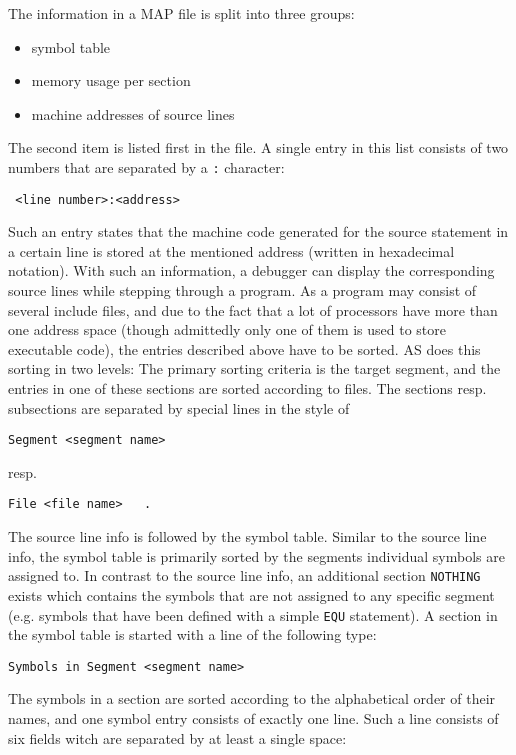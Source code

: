 \documentclass[12pt,twoside]{report}
\newcommand{\tty}[1]{{\tt #1}}
\newcommand{\asname}{{AS}}
\begin{document}
The information in a MAP file is split into three groups:
\begin{itemize}
\item{symbol table}
\item{memory usage per section}
\item{machine addresses of source lines}
\end{itemize}
The second item is listed first in the file.  A single entry in this
list consists of two numbers that are separated by a \tty{:} character:
\begin{verbatim}
 <line number>:<address>
\end{verbatim}
Such an entry states that the machine code generated for the source
statement in a certain line is stored at the mentioned address
(written in hexadecimal notation).  With such an information, a
debugger can display the corresponding source lines while stepping
through a program.  As a program may consist of several include
files, and due to the fact that a lot of processors have more than
one address space (though admittedly only one of them is used to
store executable code), the entries described above have to be
sorted.  \asname{} does this sorting in two levels: The primary sorting
criteria is the target segment, and the entries in one of these
sections are sorted according to files.  The sections resp.
subsections are separated by special lines in the style of
\begin{verbatim}
Segment <segment name>
\end{verbatim}
resp.
\begin{verbatim}
File <file name>   .
\end{verbatim}
The source line info is followed by the symbol table.  Similar to the
source line info, the symbol table is primarily sorted by the
segments individual symbols are assigned to.  In contrast to the
source line info, an additional section \tty{NOTHING} exists which contains
the symbols that are not assigned to any specific segment (e.g.
symbols that have been defined with a simple \tty{EQU} statement).  A
section in the symbol table is started with a line of the following
type:
\begin{verbatim}
Symbols in Segment <segment name>
\end{verbatim}
The symbols in a section are sorted according to the alphabetical
order of their names, and one symbol entry consists of exactly one
line.  Such a line consists of six fields witch are separated by at
least a single space:
\end{document}
